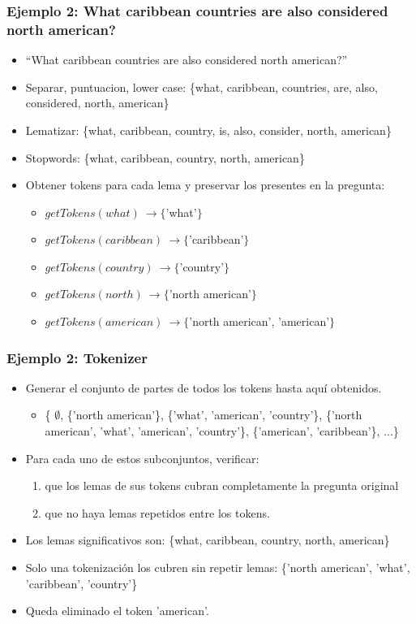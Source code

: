 \begin{frame}[<+->]
\frametitle{Ejemplo 2: What caribbean countries are also considered north american?}
  \begin{itemize}
    \item ``What caribbean countries are also considered north american?''
    \item Separar, puntuacion, lower case: \{what, caribbean, countries, are, also, considered, north, american\}
    \item Lematizar: \{what, caribbean, {\color{blue}country}, {\color{blue}is}, also, {\color{blue}consider}, north, american\}
    \item Stopwords: \{what, caribbean, country, north, american\}
    \item Obtener tokens para cada lema y preservar los presentes en la pregunta:
      \begin{itemize}
        \item $getTokens(what)\ \rightarrow \{$'what'$\}$
        \item $getTokens(caribbean)\ \rightarrow \{$'caribbean'$\}$
        \item $getTokens(country)\ \rightarrow  \{$'country'$\}$
        \item $getTokens(north)\ \rightarrow \{$'north american'$\}$
        \item $getTokens(american)\ \rightarrow \{$'north american', 'american'$\}$
      \end{itemize}
  \end{itemize}
  
\end{frame}
\begin{frame}[<+->]
\frametitle{Ejemplo 2: Tokenizer}

  \begin{itemize}
  \item Generar el conjunto de partes de todos los tokens hasta aquí obtenidos.
    \begin{itemize}
      \item    \{ $\emptyset$, \{'north american'\}, \{'what', 'american', 'country'\}, \{'north american', 'what', 'american', 'country'\}, \{'american', 'caribbean'\}, ...\}
    \end{itemize}
  \item Para cada uno de estos subconjuntos, verificar:
  \begin{enumerate}
    \item que los lemas de sus tokens cubran completamente la pregunta original
    \item que no haya lemas repetidos entre los tokens.
    \end{enumerate}
      \item Los lemas significativos son: \newline \{what, caribbean, country, north, american\}
      \item Solo una tokenización los cubren sin repetir lemas: \newline \{'north american', 'what', 'caribbean', 'country'\}
      \item Queda eliminado el token 'american'.
  \end{itemize}
\end{frame}

